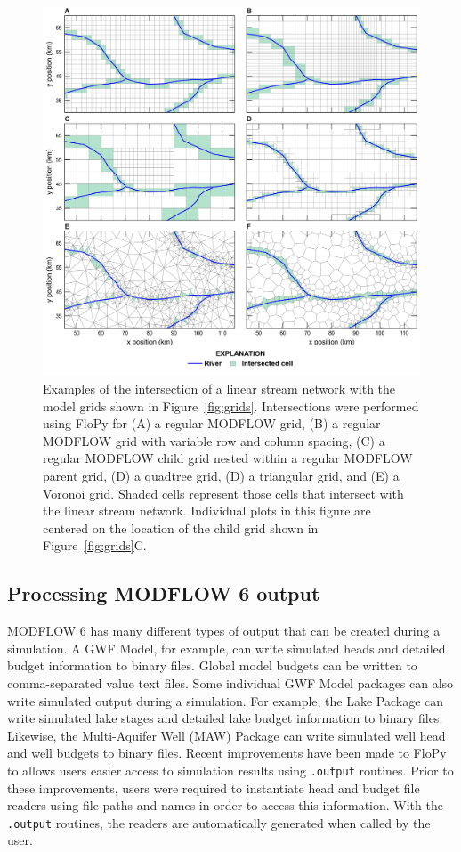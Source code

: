 \documentclass[11pt, oneside]{article}  	%
\begin{document}
\begin{figure}[ht!]
	\begin{center}
		\includegraphics{figures/grids_intersection.png}
	\end{center}
	\caption{Examples of the intersection of a linear stream network with the model grids shown in Figure~\ref{fig:grids}. Intersections were performed using FloPy for (A) a regular MODFLOW grid, (B) a regular MODFLOW grid with variable row and column spacing, (C) a regular MODFLOW child grid nested within a regular MODFLOW parent grid, (D) a quadtree grid, (D) a triangular grid, and (E) a Voronoi grid. Shaded cells represent those cells that intersect with the linear stream network. Individual plots in this figure are centered on the location of the child grid shown in Figure~\ref{fig:grids}C.}
	\label{fig:intersections}
\end{figure}

\subsection{Processing MODFLOW 6 output}

MODFLOW 6 has many different types of output that can be created during a simulation. A GWF Model, for example, can write simulated heads and detailed budget information to binary files. Global model budgets can be written to comma-separated value text files. Some individual GWF Model packages can also write simulated output during a simulation. For example, the Lake Package can write simulated lake stages and detailed lake budget information to binary files. Likewise, the Multi-Aquifer Well (MAW) Package can write simulated well head and well budgets to binary files. Recent improvements have been made to FloPy to allows users easier access to simulation results using \texttt{.output} routines. Prior to these improvements, users were required to instantiate head and budget file readers using file paths and names in order to access this information. With the \texttt{.output} routines, the readers are automatically generated when called by the user.
\end{document}
